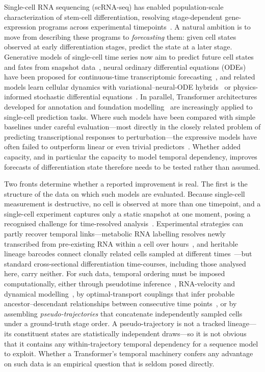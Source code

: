 \documentclass[10pt,letterpaper]{article}
\begin{document}
Single-cell RNA sequencing (scRNA-seq) has enabled population-scale characterization of stem-cell differentiation, resolving stage-dependent gene-expression programs across experimental timepoints~\cite{jerber2021population}. A natural ambition is to move from describing these programs to \emph{forecasting} them: given cell states observed at early differentiation stages, predict the state at a later stage. Generative models of single-cell time series now aim to predict future cell states and fates from snapshot data~\cite{yeo2021prescient,tong2020trajectorynet}, neural ordinary differential equations (ODEs) have been proposed for continuous-time transcriptomic forecasting~\cite{erbe2023transcriptomic}, and related models learn cellular dynamics with variational--neural-ODE hybrids~\cite{farrell2023inferring} or physics-informed stochastic differential equations~\cite{jiang2024physics}. In parallel, Transformer architectures developed for annotation and foundation modelling~\cite{chen2023transformer,cui2024scgpt} are increasingly applied to single-cell prediction tasks. Where such models have been compared with simple baselines under careful evaluation---most directly in the closely related problem of predicting transcriptional responses to perturbation---the expressive models have often failed to outperform linear or even trivial predictors~\cite{ahlmanneltze2025deep,kernfeld2023systematic}. Whether added capacity, and in particular the capacity to model temporal dependency, improves forecasts of differentiation state therefore needs to be tested rather than assumed.

Two fronts determine whether a reported improvement is real. The first is the structure of the data on which such models are evaluated. Because single-cell measurement is destructive, no cell is observed at more than one timepoint, and a single-cell experiment captures only a static snapshot at one moment, posing a recognised challenge for time-resolved analysis~\cite{la2018rna}. Experimental strategies can partly recover temporal links---metabolic RNA labelling resolves newly transcribed from pre-existing RNA within a cell over hours~\cite{erhard2019scslam,cao2020scifate}, and heritable lineage barcodes connect clonally related cells sampled at different times~\cite{weinreb2020lineage}---but standard cross-sectional differentiation time-courses, including those analysed here, carry neither. For such data, temporal ordering must be imposed computationally, either through pseudotime inference~\cite{saelens2019comparison,haghverdi2016diffusion}, RNA-velocity and dynamical modelling~\cite{la2018rna,bergen2020generalizing}, by optimal-transport couplings that infer probable ancestor--descendant relationships between consecutive time points~\cite{schiebinger2019optimal,lavenant2024toward}, or by assembling \emph{pseudo-trajectories} that concatenate independently sampled cells under a ground-truth stage order. A pseudo-trajectory is not a tracked lineage---its constituent states are statistically independent draws---so it is not obvious that it contains any within-trajectory temporal dependency for a sequence model to exploit. Whether a Transformer's temporal machinery confers any advantage on such data is an empirical question that is seldom posed directly.
\end{document}
